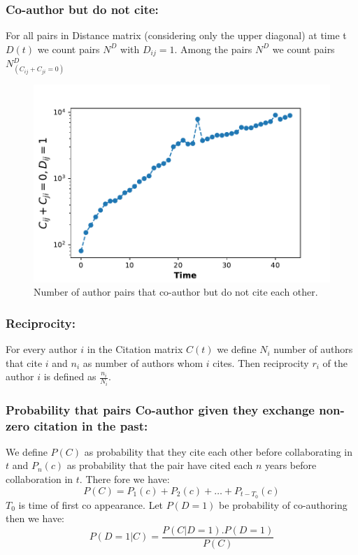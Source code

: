 \documentclass[aps, pre, twocolumn, nofootinbib]{revtex4-1}
\begin{document}
\subsubsection{Co-author but do not cite:}
For all pairs in Distance matrix (considering only the upper diagonal) at time t $D(t)$ we count pairs $N^D$ with  $D_{ij} = 1$. Among the pairs $N^D$ we count pairs $N^D_{(C_{ij} + C_{ji}=0)}$
\begin{figure}
	\centering
	\includegraphics[scale = 0.45]{plots/d1_zcit}
	
	\captionsetup{singlelinecheck=false, justification=raggedright,  labelsep=space}
	\caption{Number of author pairs that co-author but do not cite each other.}
	\label{f2}
\end{figure}

\subsubsection{Reciprocity:}
For every author $i$ in the Citation matrix $C(t)$ we define $N_i$ number of authors that cite $i$ and $n_i$ as number of authors whom $i$ cites. Then reciprocity $r_i$ of the author $i$ is defined as $\frac{n_i}{N_i}$. 


\subsubsection{Probability that pairs Co-author given they exchange non-zero citation in the past:}
We define $P(C)$ as probability that they cite each other before collaborating in  $t$ and $P_{n}(c)$ as probability that the pair have cited each $n$ years before collaboration in $t$. 
There fore we have:
\begin{equation}
P(C) = P_{1}(c) + P_{2}(c) + \dots + P_{t-T_0}(c) 
\end{equation}
$T_0$ is time of first co appearance. Let $P(D=1)$ be probability of co-authoring then we have:
\begin{equation}
P(D=1|C) = \frac{P(C|D=1).P(D=1)}{P(C)}
\end{equation}
\end{document}
